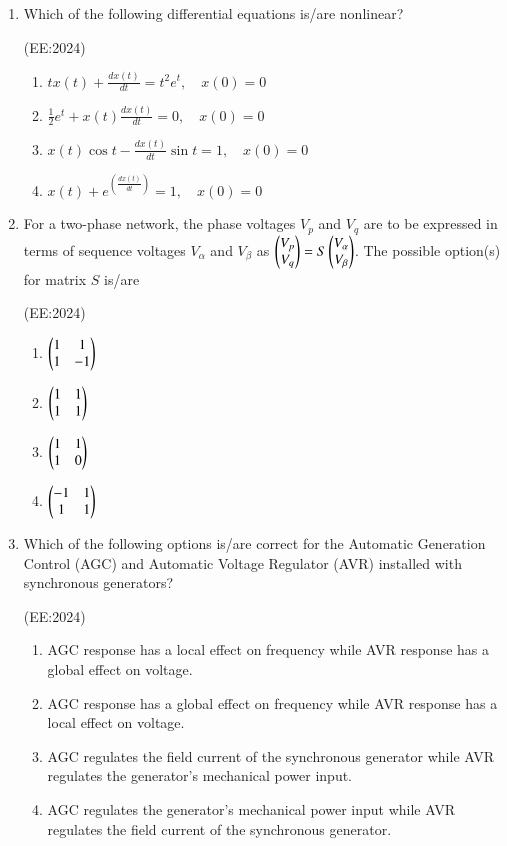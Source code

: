 \documentclass[journal,12pt,onecolumn]{IEEEtran}
\theoremstyle{remark}
\begin{document}
\begin{enumerate}
    \item Which of the following differential equations is/are nonlinear? 

	    \hfill{(EE:2024)}
		\begin{multicols}{2}
    \begin{enumerate}
        \item $t x(t) + \frac{dx(t)}{dt} = t^2 e^t, \quad x(0) = 0$
        \item $\frac{1}{2} e^t + x(t) \frac{dx(t)}{dt} = 0, \quad x(0) = 0$
        \item $x(t) \cos t - \frac{dx(t)}{dt} \sin t = 1, \quad x(0) = 0$
        \item $x(t) + e^{\left(\frac{dx(t)}{dt}\right)} = 1, \quad x(0) = 0$
    \end{enumerate}
			\end{multicols}

    \item For a two-phase network, the phase voltages $V_p$ and $V_q$ are to be expressed in terms of sequence voltages $V_\alpha$ and $V_\beta$ as $\begin{pmatrix} V_p \\ V_q \end{pmatrix} = S \begin{pmatrix} V_\alpha \\ V_\beta \end{pmatrix}$. The possible option(s) for matrix $S$ is/are 

		    \hfill{(EE:2024)}
		    \begin{multicols}{4}
    \begin{enumerate}
        \item $\begin{pmatrix} 1 & 1 \\ 1 & -1 \end{pmatrix}$
        \item $\begin{pmatrix} 1 & 1 \\ 1 & 1 \end{pmatrix}$
        \item $\begin{pmatrix} 1 & 1 \\ 1 & 0 \end{pmatrix}$
        \item $\begin{pmatrix} -1 & 1 \\ 1 & 1 \end{pmatrix}$
    \end{enumerate}
			    \end{multicols}

    \item Which of the following options is/are correct for the Automatic Generation Control (AGC) and Automatic Voltage Regulator (AVR) installed with synchronous generators?

	    \hfill{(EE:2024)}
    \begin{enumerate}
        \item AGC response has a local effect on frequency while AVR response has a global effect on voltage.
        \item AGC response has a global effect on frequency while AVR response has a local effect on voltage.
        \item AGC regulates the field current of the synchronous generator while AVR regulates the generator's mechanical power input.
        \item AGC regulates the generator's mechanical power input while AVR regulates the field current of the synchronous generator.
    \end{enumerate}


\end{enumerate}
\end{document}
